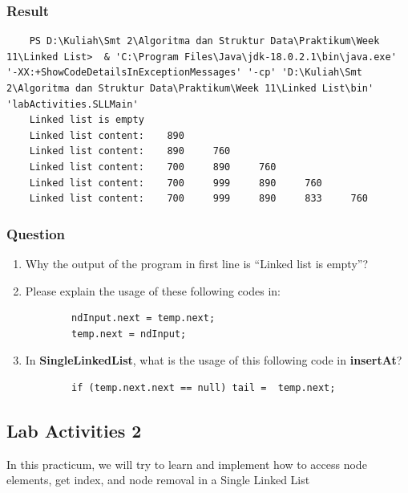 \documentclass[12pt,titlepage]{article}
\begin{document}
\subsubsection{Result}

\begin{verbatim}
    PS D:\Kuliah\Smt 2\Algoritma dan Struktur Data\Praktikum\Week 11\Linked List>  & 'C:\Program Files\Java\jdk-18.0.2.1\bin\java.exe' '-XX:+ShowCodeDetailsInExceptionMessages' '-cp' 'D:\Kuliah\Smt 2\Algoritma dan Struktur Data\Praktikum\Week 11\Linked List\bin' 'labActivities.SLLMain'
    Linked list is empty
    Linked list content:    890
    Linked list content:    890     760
    Linked list content:    700     890     760
    Linked list content:    700     999     890     760
    Linked list content:    700     999     890     833     760
\end{verbatim}

\subsubsection{Question}

\begin{enumerate}
    \item Why the output of the program in first line is “Linked list is empty”?
    \item Please explain the usage of these following codes in:
    \begin{verbatim}
        ndInput.next = temp.next;
        temp.next = ndInput;
    \end{verbatim}
    \item In \textbf{SingleLinkedList}, what is the usage of this following code in \textbf{insertAt}?
    \begin{verbatim}
        if (temp.next.next == null) tail =  temp.next;
    \end{verbatim} 
\end{enumerate}

\subsection{Lab Activities 2}
In this practicum, we will try to learn and implement how to access node elements, get index, and node removal in a Single Linked List
\end{document}
